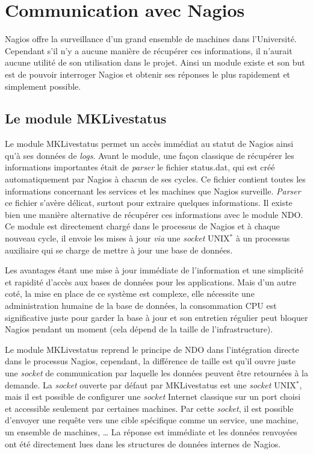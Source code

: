 \section{Communication avec Nagios}

Nagios offre la surveillance d'un grand ensemble de machines dans l'Universit\'e. 
Cependant s'il n'y a aucune mani\`ere de r\'ecup\'erer ces informations, il n'aurait aucune utilit\'e de son utilisation dans le projet.
Ainsi un module existe et son but est de pouvoir interroger Nagios et obtenir ses r\'eponses le plus rapidement et simplement possible.

\subsection{Le module MKLivestatus}
\label{section:moduleMKLivestatus}

Le module MKLivestatus permet un acc\`es imm\'ediat au statut de Nagios ainsi qu'\`a ses donn\'ees de \textit{logs}.
Avant le module, une fa\c{c}on classique de r\'ecup\'erer les informations importantes \'etait de \textit{parser} le fichier \textsf{status.dat}, qui est cr\'e\'e automatiquement par Nagios \`a chacun de ses cycles.
Ce fichier contient toutes les informations concernant les services et les machines que Nagios surveille.
\textit{Parser} ce fichier s'av\`ere d\'elicat, surtout pour extraire quelques informations.
Il existe bien une mani\`ere alternative de r\'ecup\'erer ces informations avec le module NDO.
Ce module est directement charg\'e dans le processus de Nagios et \`a chaque nouveau cycle, il envoie les mises \`a jour \textit{via} une \textit{socket} UNIX$^*$ \`a un processus auxiliaire qui se charge de mettre \`a jour une base de donn\'ees.

Les avantages \'etant une mise \`a jour imm\'ediate de l'information et une simplicit\'e et rapidit\'e d'acc\`es aux bases de donn\'ees pour les applications.
Mais d'un autre cot\'e, la mise en place de ce syst\`eme est complexe, elle n\'ecessite une administration humaine de la base de donn\'ees, la consommation CPU est significative juste pour garder la base \`a jour et son entretien r\'egulier peut bloquer Nagios pendant un moment (cela d\'epend de la taille de l'infrastructure).

Le module MKLivestatus reprend le principe de NDO dans l'int\'egration directe dans le processus Nagios, cependant, la diff\'erence de taille est qu'il ouvre juste une \textit{socket} de communication par laquelle les donn\'ees peuvent \^etre retourn\'ees \`a la demande.
La \textit{socket} ouverte par d\'efaut par MKLivestatus est une \textit{socket} UNIX$^*$, mais il est possible de configurer une \textit{socket} Internet classique sur un port choisi et accessible seulement par certaines machines.
Par cette \textit{socket}, il est possible d'envoyer une requ\^ete vers une cible sp\'ecifique comme un service, une machine, un ensemble de machines, \ldots{}
La r\'eponse est imm\'ediate et les donn\'ees renvoy\'ees ont \'et\'e directement lues dans les structures de donn\'ees internes de Nagios.

